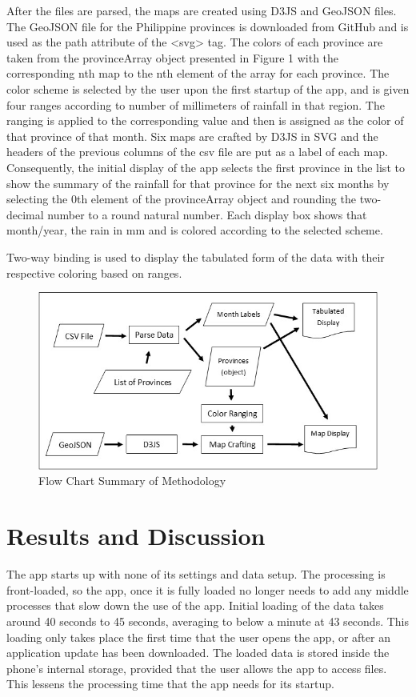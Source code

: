 \documentclass[letterpaper, 10 pt, conference]{ieeeconf}  %
\begin{document}
After the files are parsed, the maps are created using D3JS and GeoJSON files. The GeoJSON file for the Philippine provinces is downloaded from GitHub and is used as the path attribute of the <svg> tag. The colors of each province are taken from the provinceArray object presented in Figure 1 with the corresponding nth map to the nth element of the array for each province. The color scheme is selected by the user upon the first startup of the app, and is given four ranges according to number of millimeters of rainfall in that region. The ranging is applied to the corresponding value and then is assigned as the color of that province of that month. Six maps are crafted by D3JS in SVG and the headers of the previous columns of the csv file are put as a label of each map. Consequently, the initial display of the app selects the first province in the list to show the summary of the rainfall for that province for the next six months by selecting the 0th element of the provinceArray object and rounding the two-decimal number to a round natural number. Each display box shows that month/year, the rain in mm and is colored according to the selected scheme. \setlength{\parskip}{6pt}

Two-way binding is used to display the tabulated form of the data with their respective coloring based on ranges.

\begin{figure}[h!]
\centering
\includegraphics[scale=.5]{development}
\caption{Flow Chart Summary of Methodology}
\label{fig:development}
\end{figure}

\section{Results and Discussion}

The app starts up with none of its settings and data setup. The processing is front-loaded, so the app, once it is fully loaded no longer needs to add any middle processes that slow down the use of the app. Initial loading of the data takes around 40 seconds to 45 seconds, averaging to below a minute at 43 seconds. This loading only takes place the first time that the user opens the app, or after an application update has been downloaded. The loaded data is stored inside the phone’s internal storage, provided that the user allows the app to access files. This lessens the processing time that the app needs for its startup. \setlength{\parskip}{6pt}
\end{document}
